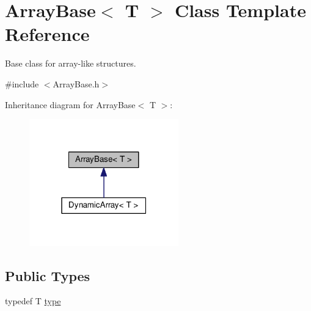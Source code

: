 \hypertarget{a00001}{\section{Array\+Base$<$ T $>$ Class Template Reference}
\label{a00001}
}


Base class for array-\/like structures.  




{\ttfamily \#include $<$Array\+Base.\+h$>$}



Inheritance diagram for Array\+Base$<$ T $>$\+:
\nopagebreak
\begin{figure}[H]
\begin{center}
\leavevmode
\includegraphics[width=183pt]{d7/d7a/a00016}
\end{center}
\end{figure}
\subsection*{Public Types}
\begin{DoxyCompactItemize}
\item 
typedef T \hyperlink{a00001_aa881b5ee704e0f293b4dddbaf8990149}{type}
\end{DoxyCompactItemize}
